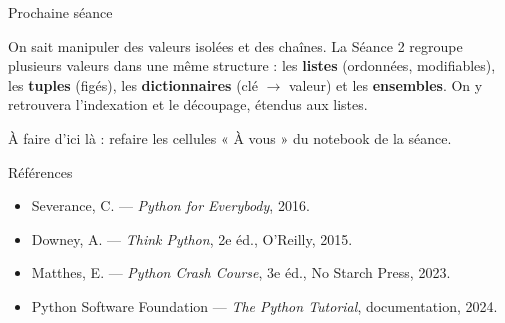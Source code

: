 \documentclass[aspectratio=169,11pt]{beamer}
\begin{document}
\begin{frame}{Prochaine séance}
\begin{ucaddef}
{\small On sait manipuler des valeurs isolées et des chaînes. La Séance 2 regroupe plusieurs valeurs dans une même structure : les \textbf{listes} (ordonnées, modifiables), les \textbf{tuples} (figés), les \textbf{dictionnaires} (clé $\rightarrow$ valeur) et les \textbf{ensembles}. On y retrouvera l'indexation et le découpage, étendus aux listes.}
\end{ucaddef}
{\small À faire d'ici là : refaire les cellules « À vous » du notebook de la séance.}
\end{frame}

\begin{frame}{Références}
\begin{itemize}\small
  \item Severance, C. — \emph{Python for Everybody}, 2016.
  \item Downey, A. — \emph{Think Python}, 2e éd., O'Reilly, 2015.
  \item Matthes, E. — \emph{Python Crash Course}, 3e éd., No Starch Press, 2023.
  \item Python Software Foundation — \emph{The Python Tutorial}, documentation, 2024.
\end{itemize}
\end{frame}
\end{document}
